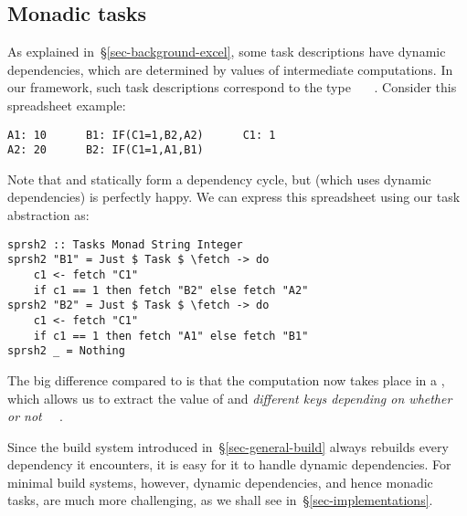 \vspace{-0.5mm}
\subsection{Monadic tasks}\label{sec-task-monad}

As explained in~\S\ref{sec-background-excel}, some task descriptions have
dynamic dependencies, which are determined by values of intermediate
computations. In our framework, such task descriptions correspond to the type
~~~. Consider this spreadsheet example:

\vspace{0.5mm}
\begin{verbatim}
A1: 10      B1: IF(C1=1,B2,A2)      C1: 1
A2: 20      B2: IF(C1=1,A1,B1)
\end{verbatim}
\vspace{0.5mm}

\noindent
Note that  and  statically form a dependency cycle, but \Excel
(which uses dynamic dependencies) is perfectly happy. We can express this
spreadsheet using our task abstraction as:


\vspace{0.5mm}
\begin{verbatim}
sprsh2 :: Tasks Monad String Integer
sprsh2 "B1" = Just $ Task $ \fetch -> do
    c1 <- fetch "C1"
    if c1 == 1 then fetch "B2" else fetch "A2"
sprsh2 "B2" = Just $ Task $ \fetch -> do
    c1 <- fetch "C1"
    if c1 == 1 then fetch "A1" else fetch "B1"
sprsh2 _ = Nothing
\end{verbatim}
\vspace{0.5mm}

\noindent
The big difference compared to  is that the computation now takes
place in a , which allows us to extract the value of  and
 \emph{different keys depending on whether or not ~\hs{==}~}.

Since the  build system introduced in~\S\ref{sec-general-build} always
rebuilds every dependency it encounters, it is easy for it to handle dynamic
dependencies. For minimal build systems, however, dynamic dependencies, and hence
monadic tasks, are much more challenging, as we shall see
in~\S\ref{sec-implementations}.


